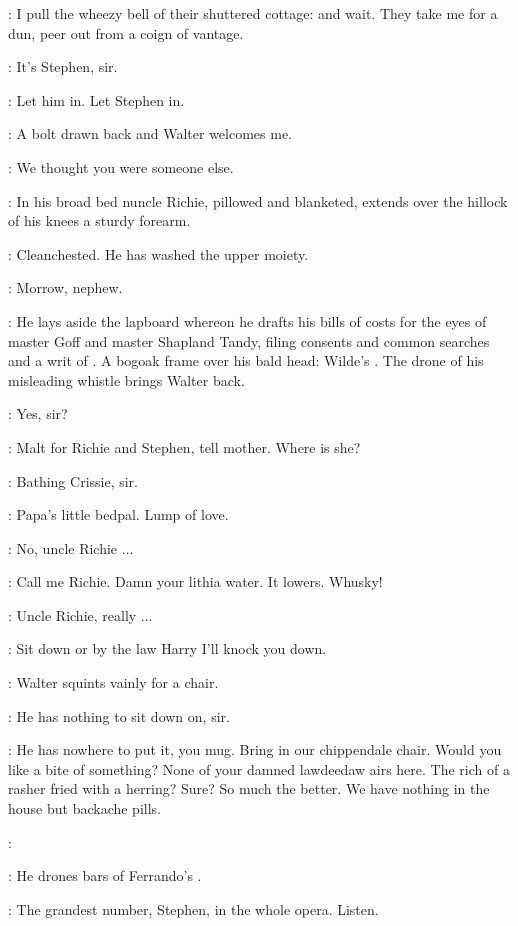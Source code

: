 \StephenInt:
I pull the wheezy bell of their shuttered cottage:
and wait.
They take me for a dun,
peer out from a coign of vantage.

\walter:
It's Stephen, sir.

\richie:
Let him in.
Let Stephen in.

\StephenInt:
A bolt drawn back and Walter welcomes me.

\walter:
We thought you were someone else.

:
In his broad bed
nuncle Richie, pillowed and blanketed,
extends over the hillock of his knees a sturdy forearm.

\StephenInt:
Cleanchested.
He has washed the upper moiety.

\richie:
Morrow, nephew.

:
He lays aside the lapboard whereon he drafts his bills of costs
for the eyes of master Goff and master Shapland Tandy,
filing consents and common searches and a writ of .
A bogoak frame over his bald head:
Wilde's .
The drone of his misleading whistle brings Walter back.

\walter:
Yes, sir?

\richie:
Malt for Richie and Stephen, tell mother.
Where is she?

\walter:
Bathing Crissie, sir.

\StephenInt:
Papa's little bedpal.
Lump of love.

\Stephen:
No, uncle Richie ...

\richie:
Call me Richie.
Damn your lithia water.
It lowers.
Whusky!

\Stephen:
Uncle Richie, really ...

\richie:
Sit down or by the law Harry
I'll knock you down.

:
Walter squints vainly for a chair.

\walter:
He has nothing to sit down on, sir.

\richie:
He has nowhere to put it, you mug.
Bring in our chippendale chair.
Would you like a bite of something?
None of your damned lawdeedaw airs here.
The rich of a rasher fried with a herring?
Sure?
So much the better.
We have nothing in the house but backache pills.

\richie:

:
He drones bars of Ferrando's .

\richie:
The grandest number, Stephen,
in the whole opera.
Listen.

